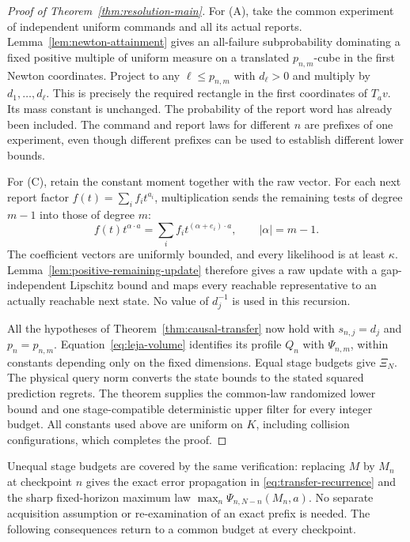 \begin{proof}[Proof of Theorem~\ref{thm:resolution-main}]
For (A), take the common experiment of independent uniform commands and
all its actual reports. Lemma~\ref{lem:newton-attainment} gives an
all-failure subprobability dominating a fixed positive multiple of
uniform measure on a translated $p_{n,m}$-cube in the first Newton
coordinates. Project to any $\ell\le p_{n,m}$ with $d_\ell>0$
and multiply by $d_1,\ldots,d_\ell$. This is precisely the required
rectangle in the first coordinates of $T_av$. Its mass constant is
unchanged. The probability of the report word has already been
included. The command and report laws for different $n$ are prefixes
of one experiment, even though different prefixes can be used to
establish different lower bounds.

For (C), retain the constant moment together with the raw vector.
For each next report factor $f(t)=\sum_i f_i t^{a_i}$, multiplication
sends the remaining tests of degree $m-1$ into those of degree $m$:
\[
 f(t)t^{\alpha\cdot a}=\sum_i f_i t^{(\alpha+e_i)\cdot a},
 \qquad |\alpha|=m-1.
\]
The coefficient vectors are uniformly bounded, and every likelihood
is at least $\kappa$. Lemma~\ref{lem:positive-remaining-update}
therefore gives a raw update with a gap-independent Lipschitz bound
and maps every reachable representative to an actually reachable next
state. No value of $d_j^{-1}$ is used in this recursion.

All the hypotheses of Theorem~\ref{thm:causal-transfer} now hold with
$s_{n,j}=d_j$ and $p_n=p_{n,m}$. Equation~\eqref{eq:leja-volume}
identifies its profile $Q_n$ with $\Psi_{n,m}$, within constants
depending only on the fixed dimensions. Equal stage budgets give
$\Xi_N$. The physical query norm converts the state bounds to the
stated squared prediction regrets. The theorem supplies the common-law
randomized lower bound and one stage-compatible deterministic upper
filter for every integer budget. All constants used above are uniform
on $K$, including collision configurations, which completes the proof.
\end{proof}

Unequal stage budgets are covered by the same verification: replacing
$M$ by $M_n$ at checkpoint $n$ gives the exact error propagation in
\eqref{eq:transfer-recurrence} and the sharp fixed-horizon maximum law
$\max_n\Psi_{n,N-n}(M_n,a)$. No separate acquisition assumption or
re-examination of an exact prefix is needed. The following consequences
return to a common budget at every checkpoint.

